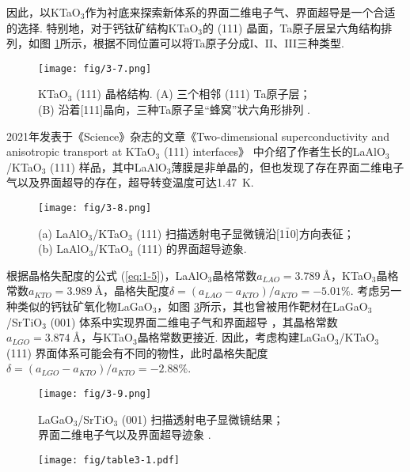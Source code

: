 \documentclass[12pt,a4paper,openany,twoside,UTF-8]{book}
\begin{document}
因此，以KTaO$_3$作为衬底来探索新体系的界面二维电子气、界面超导是一个合适的选择. 特别地，对于钙钛矿结构KTaO$_3$的 (111) 晶面，Ta原子层呈六角结构排列，如图 \ref{fig:3-7}所示，根据不同位置可以将Ta原子分成I、II、III三种类型. 

\begin{figure}[htbp]
\centering
\texttt{[image: fig/3-7.png]}
\caption{KTaO$_3$ (111) 晶格结构. (A) 三个相邻 (111) Ta原子层；\\
      (B) 沿着[111]晶向，三种Ta原子呈“蜂窝”状六角形排列 \cite{ref22}.}
\label{fig:3-7} 
\end{figure}
  
 2021年发表于《Science》杂志的文章《Two-dimensional superconductivity and anisotropic transport at KTaO$_3$ (111) interfaces》 \cite{ref22}中介绍了作者生长的LaAlO$_3$/KTaO$_3$ (111) 样品，其中LaAlO$_3$薄膜是非单晶的，但也发现了存在界面二维电子气以及界面超导的存在，超导转变温度可达\SI{1.47}{K}. 
 
\begin{figure}[htbp]
\centering
\texttt{[image: fig/3-8.png]}
\caption{(a) LaAlO$_3$/KTaO$_3$ (111) 扫描透射电子显微镜沿[1$\bar{1}$0]方向表征；\\
      (b) LaAlO$_3$/KTaO$_3$ (111) 的界面超导迹象.}
\label{fig:3-8} 
\end{figure}
 
根据晶格失配度的公式 (\ref{eq:1-5})，LaAlO$_3$晶格常数$a_{LAO} = \SI{3.789}{Å}$，KTaO$_3$晶格常数$a_{KTO} = \SI{3.989}{Å}$，晶格失配度$\delta = (a_{LAO} - a_{KTO})/a_{KTO} = -5.01\%$. 
考虑另一种类似的钙钛矿氧化物LaGaO$_3$，如图 \ref{fig:3-9}所示，其也曾被用作靶材在LaGaO$_3$/SrTiO$_3$ (001) 体系中实现界面二维电子气和界面超导 \cite{ref36}，其晶格常数$a_{LGO} = \SI{3.874}{Å}$，与KTaO$_3$晶格常数更接近. 因此，考虑构建LaGaO$_3$/KTaO$_3$ (111) 界面体系可能会有不同的物性，此时晶格失配度$\delta= (a_{LGO} - a_{KTO})/a_{KTO} = -2.88\%$.

\begin{figure}[htbp]
\centering
\texttt{[image: fig/3-9.png]}
\caption{LaGaO$_3$/SrTiO$_3$ (001) 扫描透射电子显微镜结果；\\界面二维电子气以及界面超导迹象 \cite{ref36}.}
\label{fig:3-9} 
\end{figure}
  
\begin{figure}[htbp]
\centering
\texttt{[image: fig/table3-1.pdf]}
\end{figure}
 
\end{document}
